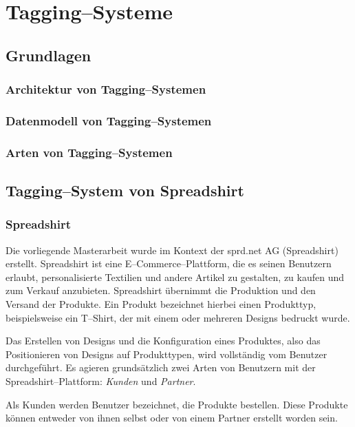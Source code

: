 \chapter{Tagging--Systeme}

\section{Grundlagen}

\subsection{Architektur von Tagging--Systemen}

\subsection{Datenmodell von Tagging--Systemen}

\subsection{Arten von Tagging--Systemen}

\section{Tagging--System von Spreadshirt}

\subsection{Spreadshirt}
\label{spreadshirt}

Die vorliegende Masterarbeit wurde im Kontext der sprd.net AG (Spreadshirt) \cite{sprd2013} erstellt. Spreadshirt ist eine E--Commerce--Plattform, die es seinen Benutzern erlaubt, personalisierte Textilien und andere Artikel zu gestalten, zu kaufen und zum Verkauf anzubieten. Spreadshirt übernimmt die Produktion und den Versand der Produkte. Ein Produkt bezeichnet hierbei einen Produkttyp, beispielsweise ein T--Shirt, der mit einem oder mehreren Designs bedruckt wurde.

Das Erstellen von Designs und die Konfiguration eines Produktes, also das Positionieren von Designs auf Produkttypen, wird vollständig vom Benutzer durchgeführt. Es agieren grundsätzlich zwei Arten von Benutzern mit der Spreadshirt--Plattform: \emph{Kunden} und \emph{Partner}.

Als Kunden werden Benutzer bezeichnet, die Produkte bestellen. Diese Produkte können entweder von ihnen selbst oder von einem Partner erstellt worden sein. 


